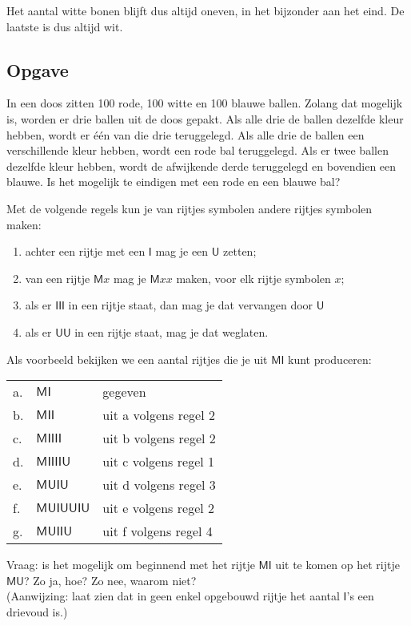 Het aantal witte bonen blijft dus altijd oneven, in het bijzonder aan het eind. De laatste is dus altijd wit.

\subsection{Opgave}
\begin{exercise}[Optioneel]
In een doos zitten 100 rode, 100 witte en 100 blauwe ballen. Zolang dat mogelijk is, worden er drie ballen uit de doos gepakt. Als alle drie de ballen dezelfde kleur hebben, wordt er \'e\'en van die drie teruggelegd. Als alle drie de ballen een verschillende kleur hebben, wordt een rode bal teruggelegd. Als er twee ballen dezelfde kleur hebben, wordt de afwijkende derde teruggelegd en bovendien een blauwe. Is het mogelijk te eindigen met een rode en een blauwe bal?
\end{exercise}

\begin{exercise}[Optioneel]
Met de volgende regels kun je van rijtjes symbolen andere rijtjes symbolen maken:
\begin{enumerate}[label=\arabic*.]
    \item achter een rijtje met een $\mathsf{I}$ mag je een $\mathsf{U}$ zetten;
    \item van een rijtje $\mathsf{M}x$ mag je $\mathsf{M}xx$ maken, voor elk rijtje symbolen $x$;
    \item als er $\mathsf{I}\mathsf{I}\mathsf{I}$ in een rijtje staat, dan mag je dat vervangen door $\mathsf{U}$
    \item als er $\mathsf{U}\mathsf{U}$ in een rijtje staat, mag je dat weglaten.
\end{enumerate}
Als voorbeeld bekijken we een aantal rijtjes die je uit $\mathsf{MI}$ kunt produceren:

\begin{tabular}{lll}
a. & $\mathsf{MI}$ & gegeven \\
b. & $\mathsf{MII}$ & uit a volgens regel 2 \\
c. & $\mathsf{MIIII}$ & uit b volgens regel 2 \\
d. & $\mathsf{MIIIIU}$ & uit c volgens regel 1 \\
e. & $\mathsf{MUIU}$ & uit d volgens regel 3 \\
f. & $\mathsf{MUIUUIU}$ & uit e volgens regel 2 \\
g. & $\mathsf{MUIIU}$ & uit f volgens regel 4 
\end{tabular}

\noindent
Vraag: is het mogelijk om beginnend met het rijtje $\mathsf{MI}$ uit te komen op het rijtje $\mathsf{MU}$? Zo ja, hoe? Zo nee, waarom niet?\\
(Aanwijzing: laat zien dat in geen enkel opgebouwd rijtje het aantal $\mathsf{I}$'s een drievoud is.)
\end{exercise}
